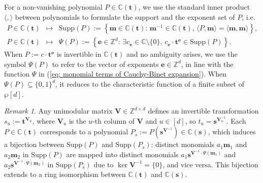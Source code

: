 \documentclass[10pt]{article}
\theoremstyle{remark}%
\newtheorem{rem}{Remark}%
\theoremstyle{definition}%
\begin{document}
For a non-vanishing polynomial $P\in\mathbb{C}(\mathbf{t})$, we use the standard inner product $\langle,\rangle$ between polynomials to formulate the support and the exponent set of $P$, i.e.
\begin{eqnarray}
P\in\mathbb{C}(\mathbf{t}) & \mapsto & \mathrm{Supp}(P):=\left\{ \mathbf{m}\in\mathbb{C}(\mathbf{t}):\,\mathbf{m}^{-1}\in\mathbb{C}(\mathbf{t}),\,\langle P,\mathbf{m}\rangle=\langle\mathbf{m},\mathbf{m}\rangle\right\} 
\label{eq: monomial terms in a polynomial},\\
P\in\mathbb{C}(\mathbf{t}) & \mapsto & \Psi(P):=\left\{ \mathbf{e}\in\mathbb{Z}^{d}:\,\exists c_{\mathbf{e}}\in\mathbb{C}\setminus\{0\},\,c_{\mathbf{e}}\cdot\mathbf{t}^{\mathbf{e}}\in\mathrm{Supp}(P)\right\}.
\label{eq: phases of monomials in a polynomial}
\end{eqnarray}
When $P:=c\cdot\mathbf{t}^{\mathbf{e}}$ is invertible in $\mathbb{C}(\mathbf{t})$ and no ambiguity arises, we use the symbol $\Psi(P)$ to refer to the vector of exponents $\mathbf{e}\in\mathbb{Z}^{d}$, in line with the function $\Psi$ in (\ref{eq: monomial terms of Cauchy-Binet expansion}). %
When $\Psi(P)\subseteq\{0,1\}^{d}$, it reduces to the characteristic function of a finite subset of $\wp[d]$.  

\begin{rem}
\label{rem: invertible change of indeterminates}
Any unimodular matrix $\mathbf{V}\in\mathbb{Z}^{d\times d}$ defines an invertible transformation $s_{u}:=\mathbf{t}^{\mathbf{V}_{u}}$, where $\mathbf{V}_{u}$ is the $u$-th column of $\mathbf{V}$ and $u\in[d]$, so $t_{u}=\mathbf{s}^{\mathbf{V}_{u}^{-1}}$. Each $P\in\mathbb{C}(\mathbf{t})$ corresponds to a polynomial $P_{s}:=P(\mathbf{s}^{\mathbf{V}^{-1}})\in\mathbb{C}(\mathbf{s})$, which induces a bijection between $\mathrm{Supp}(P)$ and $\mathrm{Supp}(P_{s})$: distinct monomials $a_{1}\mathbf{m}_{1}$ and $a_{2}\mathbf{m}_{2}$ in $\mathrm{Supp}(P)$ are mapped into distinct monomials $a_{1}\mathbf{s}^{\mathbf{V}^{-1}\cdot \Psi(\mathbf{m}_{1})}$ and $a_{2}\mathbf{s}^{\mathbf{V}^{-1}\cdot \Psi(\mathbf{m}_{2})}$ in $\mathrm{Supp}(P_{s})$ due to $\ker\mathbf{V}^{-1}=\{0\}$, and vice versa. This bijection extends to a ring isomorphism between $\mathbb{C}(\mathbf{t})$ and $\mathbb{C}(\mathbf{s})$. 
\end{rem}
\end{document}
